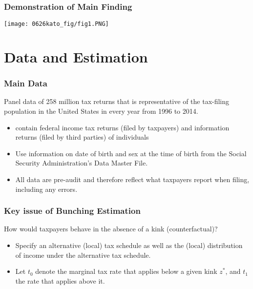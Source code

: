 \documentclass[unicode,12pt]{beamer}
\begin{document}
    \begin{frame}
        \frametitle{Demonstration of Main Finding}
    
        \centerline{\texttt{[image: 0626kato\_fig/fig1.PNG]}}
    
    \end{frame}
    

    \section{Data and Estimation}


    \begin{frame}
        \frametitle{Main Data}
    
        Panel data of 258 million tax returns that is representative of the tax-filing population in the United States
        in every year from 1996 to 2014.
        \begin{itemize}
            \item contain federal income tax returns (filed by taxpayers) and information returns (filed by third parties) of individuals
            \item Use information on date of birth and sex at the time of birth from the Social Security Administration's Data Master File.
            \item All data are pre-audit and therefore reflect what taxpayers report when filing, including any errors.
        \end{itemize}
    
    \end{frame}

    \begin{frame}
        \frametitle{Key issue of Bunching Estimation}
    
        How would taxpayers behave in the absence of a kink (counterfactual)?
        \begin{itemize}
            \item Specify an alternative (local) tax schedule as well as the (local) distribution of income under the alternative tax schedule.
            \item Let $t_0$ denote the marginal tax rate that applies below a given kink $z^*$, and $t_1$ the rate that applies above it.
        \end{itemize}
    
    \end{frame}
\end{document}
